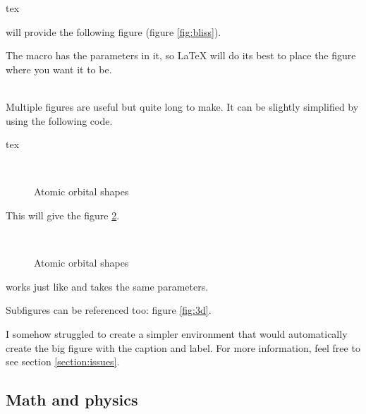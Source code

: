 \documentclass[a4paper, 11pt]{old-dms}
\begin{document}
\begin{codeboxnonos}{tex}
\end{codeboxnonos}

will provide the following figure (figure \ref{fig:bliss}).


The macro has the  parameters in it, so \LaTeX{} will do its best to place the figure where you want it to be.

~\\

Multiple figures are useful but  quite long to make. It can be slightly simplified by using the following code.

\begin{codeboxnonos}{tex}
\begin{figure}[ht!]
    \centering
    \\
    \caption{Atomic orbital shapes}
    \label{fig:orbitals}
\end{figure}
\end{codeboxnonos}

This will give the figure \ref{fig:orbitals}.

\begin{figure}[ht!]
    \centering
    \\
    \caption{Atomic orbital shapes}
    \label{fig:orbitals}
\end{figure}

 works just like  and takes the same parameters.

Subfigures can be referenced too: figure \ref{fig:3d}.

I somehow struggled to create a simpler  environment that would automatically create the big figure with the caption and label. For more information, feel free to see section \ref{section:issues}.


\subsection{Math and physics}
\end{document}
